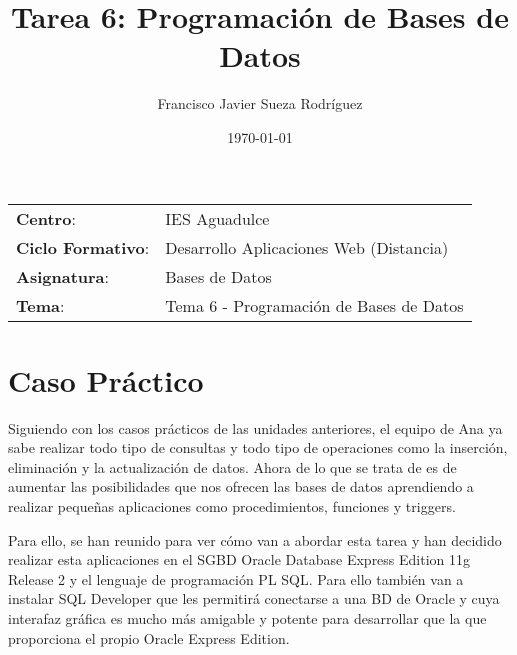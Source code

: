 


\title{
\vspace{10ex}
\normalfont \normalsize
\Huge \textbf{Tarea 6: Programación de Bases de Datos}
}
\author{Francisco Javier Sueza Rodríguez}
\date{\normalsize\today}



\maketitle

\thispagestyle{empty}

\vspace{62ex}

\begin{center}
    \begin{tabular}{l l}
        \textbf{Centro}: & IES Aguadulce \\
        \textbf{Ciclo Formativo}: & Desarrollo Aplicaciones Web (Distancia)\\
        \textbf{Asignatura}: & Bases de Datos\\
        \textbf{Tema}: & Tema 6 - Programación de Bases de Datos\\
    \end{tabular}
\end{center}

\newpage

\section{Caso Práctico}
Siguiendo con los casos prácticos de las unidades anteriores, el equipo de Ana ya sabe realizar  todo tipo de consultas y todo tipo de  operaciones como la inserción, eliminación y la actualización de datos. Ahora de lo que se trata de es de aumentar las posibilidades que nos ofrecen las bases de datos aprendiendo a realizar pequeñas aplicaciones como procedimientos, funciones y triggers.

Para ello, se han reunido para ver cómo van a abordar esta tarea y han decidido realizar esta aplicaciones en el SGBD Oracle Database Express Edition 11g Release 2 y el  lenguaje de programación PL SQL. Para ello también van a instalar SQL Developer que les permitirá conectarse a una BD de Oracle y cuya interafaz gráfica es mucho más amigable y potente para desarrollar que la que proporciona el propio Oracle Express Edition.

